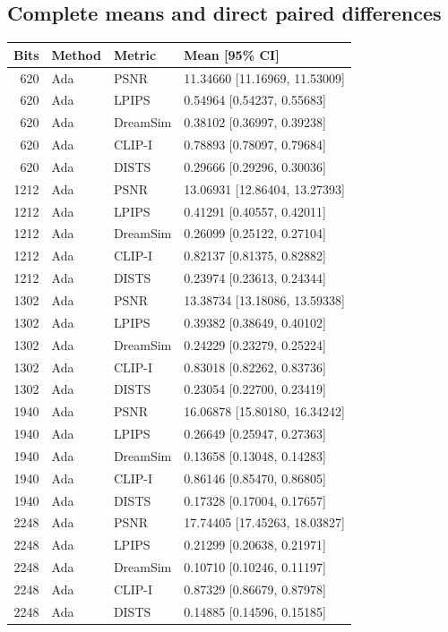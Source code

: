 \documentclass[10pt,letterpaper]{article}
\begin{document}
\subsection{Complete means and direct paired differences}
\begin{longtable}{@{}rlll@{}}\toprule
Bits & Method & Metric & Mean [95\% CI]\\\midrule\endhead
620 & Ada & PSNR & 11.34660 [11.16969, 11.53009]\\
620 & Ada & LPIPS & 0.54964 [0.54237, 0.55683]\\
620 & Ada & DreamSim & 0.38102 [0.36997, 0.39238]\\
620 & Ada & CLIP-I & 0.78893 [0.78097, 0.79684]\\
620 & Ada & DISTS & 0.29666 [0.29296, 0.30036]\\
1212 & Ada & PSNR & 13.06931 [12.86404, 13.27393]\\
1212 & Ada & LPIPS & 0.41291 [0.40557, 0.42011]\\
1212 & Ada & DreamSim & 0.26099 [0.25122, 0.27104]\\
1212 & Ada & CLIP-I & 0.82137 [0.81375, 0.82882]\\
1212 & Ada & DISTS & 0.23974 [0.23613, 0.24344]\\
1302 & Ada & PSNR & 13.38734 [13.18086, 13.59338]\\
1302 & Ada & LPIPS & 0.39382 [0.38649, 0.40102]\\
1302 & Ada & DreamSim & 0.24229 [0.23279, 0.25224]\\
1302 & Ada & CLIP-I & 0.83018 [0.82262, 0.83736]\\
1302 & Ada & DISTS & 0.23054 [0.22700, 0.23419]\\
1940 & Ada & PSNR & 16.06878 [15.80180, 16.34242]\\
1940 & Ada & LPIPS & 0.26649 [0.25947, 0.27363]\\
1940 & Ada & DreamSim & 0.13658 [0.13048, 0.14283]\\
1940 & Ada & CLIP-I & 0.86146 [0.85470, 0.86805]\\
1940 & Ada & DISTS & 0.17328 [0.17004, 0.17657]\\
2248 & Ada & PSNR & 17.74405 [17.45263, 18.03827]\\
2248 & Ada & LPIPS & 0.21299 [0.20638, 0.21971]\\
2248 & Ada & DreamSim & 0.10710 [0.10246, 0.11197]\\
2248 & Ada & CLIP-I & 0.87329 [0.86679, 0.87978]\\
2248 & Ada & DISTS & 0.14885 [0.14596, 0.15185]\\

\end{longtable}
\end{document}
